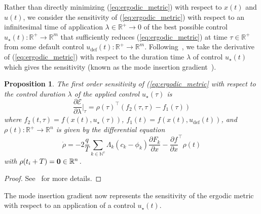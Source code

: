 \documentclass[letterpaper, 10 pt, conference]{ieeeconf}  %
\newtheorem{proposition}{Proposition}
\begin{document}
Rather than directly minimizing (\ref{eq:ergodic_metric}) with respect to $x(t)$ and $u(t)$, we consider the sensitivity of (\ref{eq:ergodic_metric}) with respect to an infinitesimal time of application  $\lambda \in \mathbb{R^+} \to 0$ of the best possible control $u_\star(t) : \mathbb{R}^+ \to \mathbb{R}^m$ that sufficiently reduces (\ref{eq:ergodic_metric}) at time $\tau \in \mathbb{R}^+$ from some default control $u_\text{def}(t) : \mathbb{R}^+  \to \mathbb{R}^m$.
Following~\cite{mavrommatiTRO2017realTime}, we take the derivative of (\ref{eq:ergodic_metric}) with respect to the duration time $\lambda$ of control $u_\star(t)$ which gives the sensitivity (known as the mode insertion gradient~\cite{vasudevan2013consistent, axelsson2008gradient, egerstedt2006transition,caldwell2016projection}).
\begin{proposition} \label{prop:mode_insert}
The first order sensitivity of (\ref{eq:ergodic_metric} with respect to the control duration $\lambda$ of the applied control $u_\star(\tau)$ is
\begin{equation}\label{eq:mode_insertion}
\frac{\partial \mathcal{E}}{\partial \lambda} \Big \vert_\tau = \rho(\tau)^\top (f_2(\tau, \tau) - f_1(\tau))
\end{equation}
where $f_2(t, \tau) = f(x(t), u_\star(\tau))$, $f_1(t) = f(x(t), u_\text{def}(t))$, and $\rho(t) : \mathbb{R}^+ \to \mathbb{R}^n$ is given by the differential equation
\begin{equation*}
\dot{\rho} = - 2 \frac{q}{T} \sum_{k \in \mathbb{N}^v} \Lambda_k (c_k - \phi_k) \frac{\partial F_k}{\partial x} - \frac{\partial f}{\partial x}^\top \rho(t)
\end{equation*}
with $\rho(t_i + T) = \bold{0} \in \mathbb{R}^n$.
\end{proposition}
\begin{proof}
See~\cite{mavrommatiTRO2017realTime} for more details.
\end{proof}
The mode insertion gradient now represents the sensitivity of the ergodic metric with respect to an application of a control $u_\star (t)$. 
\end{document}

